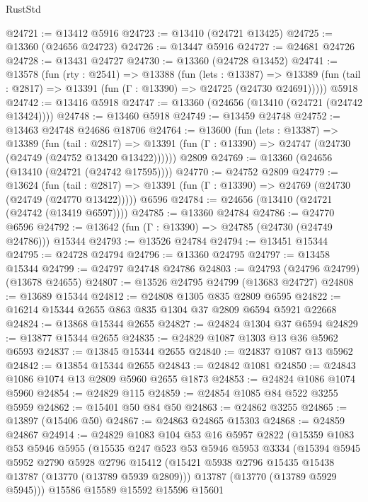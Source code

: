 \begin{lexlean}{RustStd}
\begin{coremodule}
@24721 := @13412 @5916
@24723 := @13410 (@24721 @13425)
@24725 := @13360 (@24656 @24723)
@24726 := @13447 @5916
@24727 := @24681 @24726
@24728 := @13431 @24727
@24730 := @13360 (@24728 @13452)
@24741 := @13578
    (fun (rty : @2541) =>
    @13388
      (fun (lets : @13387) =>
      @13389 (fun (tail : @2817) => @13391 (fun (Γ : @13390) => @24725 (@24730 @24691)))))
    @5918
@24742 := @13416 @5918
@24747 := @13360 (@24656 (@13410 (@24721 (@24742 @13424))))
@24748 := @13460 @5918
@24749 := @13459 @24748
@24752 := @13463 @24748 @24686 @18706
@24764 := @13600
    (fun (lets : @13387) =>
    @13389
      (fun (tail : @2817) =>
      @13391 (fun (Γ : @13390) => @24747 (@24730 (@24749 (@24752 @13420 @13422))))))
    @2809
@24769 := @13360 (@24656 (@13410 (@24721 (@24742 @17595))))
@24770 := @24752 @2809
@24779 := @13624
    (fun (tail : @2817) => @13391 (fun (Γ : @13390) => @24769 (@24730 (@24749 (@24770 @13422)))))
    @6596
@24784 := @24656 (@13410 (@24721 (@24742 (@13419 @6597))))
@24785 := @13360 @24784
@24786 := @24770 @6596
@24792 := @13642 (fun (Γ : @13390) => @24785 (@24730 (@24749 @24786))) @15344
@24793 := @13526 @24784
@24794 := @13451 @15344
@24795 := @24728 @24794
@24796 := @13360 @24795
@24797 := @13458 @15344
@24799 := @24797 @24748 @24786
@24803 := @24793 (@24796 @24799) (@13678 @24655)
@24807 := @13526 @24795 @24799 (@13683 @24727)
@24808 := @13689 @15344
@24812 := @24808 @1305 @835 @2809 @6595
@24822 := @16214 @15344 @2655 @863 @835 @1304 @37 @2809 @6594 @5921 @22668
@24824 := @13868 @15344 @2655
@24827 := @24824 @1304 @37 @6594
@24829 := @13877 @15344 @2655
@24835 := @24829 @1087 @1303 @13 @36 @5962 @6593
@24837 := @13845 @15344 @2655
@24840 := @24837 @1087 @13 @5962
@24842 := @13854 @15344 @2655
@24843 := @24842 @1081
@24850 := @24843 @1086 @1074 @13 @2809 @5960 @2655 @1873
@24853 := @24824 @1086 @1074 @5960
@24854 := @24829 @115
@24859 := @24854 @1085 @84 @522 @3255 @5959
@24862 := @15401 @50 @84 @50
@24863 := @24862 @3255
@24865 := @13897 (@15406 @50)
@24867 := @24863 @24865 @15303
@24868 := @24859 @24867
@24914 := @24829
    @1083
    @104
    @53
    @16
    @5957
    @2822
    (@15359
      @1083
      @53
      @5946
      @5955
      (@15535
        @247
        @523
        @53
        @5946
        @5953
        @3334
        (@15394
          @5945
          @5952
          @2790
          @5928
          @2796
          @15412
          (@15421 @5938 @2796 @15435 @15438 @13787 (@13770 (@13789 @5939 @2809)))
          @13787
          (@13770 (@13789 @5929 @5945)))
        @15586
        @15589
        @15592
        @15596
        @15601

\end{coremodule}
\end{lexlean}
